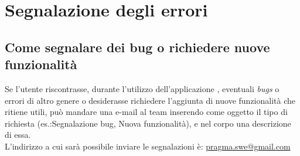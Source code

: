 \section{Segnalazione degli errori} \label{sgnErr}
\subsection{Come segnalare dei bug o richiedere nuove funzionalità}
Se l'utente riscontrasse, durante l'utilizzo dell'applicazione \textbf{\textit{\progetto}}, eventuali \textit{bugs} o errori di altro genere o desiderasse richiedere l'aggiunta di nuove funzionalità che ritiene utili, può mandare una e-mail al team \textbf{\textit{\gruppo}} inserendo come oggetto il tipo di richiesta (es.:Segnalazione bug, Nuova funzionalità), e nel corpo una descrizione di essa.\\
L'indirizzo a cui sarà possibile inviare le segnalazioni è: \href{mailto:pragma.swe@gmail.com}{pragma.swe@gmail.com}